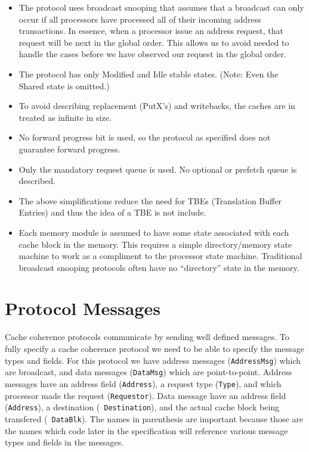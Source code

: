 \documentclass[11pt]{article}
\begin{document}
\begin{itemize}

\item
The protocol uses broadcast snooping that assumes that a broadcast can
only occur if all processors have processed all of their incoming
address transactions.  In essence, when a processor issue an address
request, that request will be next in the global order.  This allows
us to avoid needed to handle the cases before we have observed our
request in the global order.

\item
The protocol has only Modified and Idle stable states.  (Note: Even
the Shared state is omitted.)

\item
To avoid describing replacement (PutX's) and writebacks, the caches
are in treated as infinite in size.

\item
No forward progress bit is used, so the protocol as specified does not
guarantee forward progress.

\item
Only the mandatory request queue is used.  No optional or prefetch
queue is described.

\item
The above simplifications reduce the need for TBEs (Translation Buffer
Entries) and thus the idea of a TBE is not include.

\item
Each memory module is assumed to have some state associated with each
cache block in the memory.  This requires a simple directory/memory
state machine to work as a compliment to the processor state machine.
Traditional broadcast snooping protocols often have no ``directory''
state in the memory.

\end{itemize}

\section*{Protocol Messages}

Cache coherence protocols communicate by sending well defined
messages.  To fully specify a cache coherence protocol we need to be
able to specify the message types and fields.  For this protocol we
have address messages ({\tt AddressMsg}) which are broadcast, and data
messages ({\tt DataMsg}) which are point-to-point.  Address messages
have an address field ({\tt Address}), a request type ({\tt Type}),
and which processor made the request ({\tt Requestor}).  Data message
have an address field ({\tt Address}), a destination ({\tt
Destination}), and the actual cache block being transfered ({\tt
DataBlk}).  The names in parenthesis are important because those are
the names which code later in the specification will reference various
message types and fields in the messages.
\end{document}
